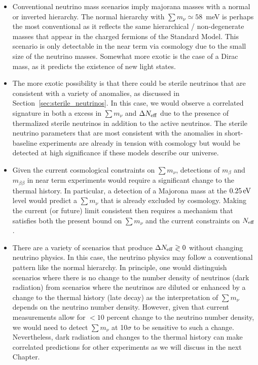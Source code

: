 \begin{itemize}
\item Conventional neutrino mass scenarios imply majorana masses with a normal or inverted hierarchy.  The normal hierarchy with $\sum m_\nu \simeq 58$~meV is perhaps the most conventional as it reflects the same hierarchical / non-degenerate masses that appear in the charged fermions of the Standard Model.  This scenario is only detectable in the near term via cosmology due to the small size of the neutrino masses.  Somewhat more exotic is the case of a Dirac mass, as it predicts the existence of new light states.

\item The more exotic possibility is that there could be sterile neutrinos that are consistent with a variety of anomalies, as discussed in Section~\ref{sec:sterile_neutrinos}.  In this case, we would observe a correlated signature in both a excess in $\sum m_\nu$ and $\Delta N_{\rm eff}$ due to the presence of thermalized sterile neutrinos in addition to the active neutrinos.  The sterile neutrino parameters that are most consistent with the anomalies in short-baseline experiments are already in tension with cosmology but would be detected at high significance if these models describe our universe.  

\item Given the current cosmological constraints on $\sum m_\nu$, detections of $m_\beta$ and $m_{\beta \beta}$ in near term experiments would require a significant change to the thermal history.  In particular, a detection of a Majorona mass at the $0.25 \, {\rm eV}$ level would predict a $\sum m_\nu$ that is already excluded by cosmology.  Making the current (or future) limit consistent then requires a mechanism that satisfies both the present bound on $\sum m_\nu$ and the current constraints on $N_{\rm eff}$.


\item There are a variety of scenarios that produce $\Delta N_{\rm eff}  \gtrless 0$ without changing neutrino physics.  In this case, the neutrino physics may follow a conventional pattern like the normal hierarchy.  In principle, one would distinguish scenarios where there is no change to the number density of neutrinos (dark radiation) from scenarios where the neutrinos are diluted or enhanced by a change to the thermal history (late decay) as the interpretation of $\sum m_\nu$ depends on the neutrino number density.  However, given that current measurements allow for $< 10$ percent change to the neutrino number density, we would need to detect $\sum m_\nu$ at 10$\sigma$ to be sensitive to such a change.  Nevertheless, dark radiation and changes to the thermal history can make correlated predictions for other experiments as we will discuss in the next Chapter.


\end{itemize}

